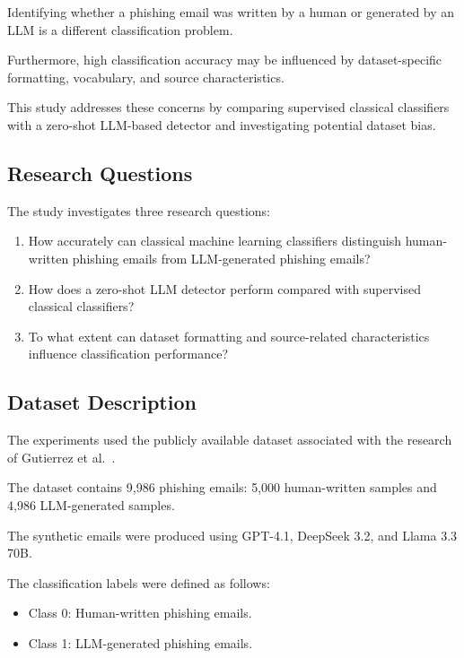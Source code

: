 \documentclass[sigconf,nonacm]{acmart}
\begin{document}
Identifying whether a phishing email was
written by a human or generated by an LLM
is a different classification problem.

Furthermore, high classification accuracy
may be influenced by dataset-specific
formatting, vocabulary, and source
characteristics.

This study addresses these concerns by
comparing supervised classical classifiers
with a zero-shot LLM-based detector and
investigating potential dataset bias.

\subsection{Research Questions}

The study investigates three research
questions:

\begin{enumerate}
    \item How accurately can classical
    machine learning classifiers distinguish
    human-written phishing emails from
    LLM-generated phishing emails?

    \item How does a zero-shot LLM detector
    perform compared with supervised
    classical classifiers?

    \item To what extent can dataset
    formatting and source-related
    characteristics influence classification
    performance?
\end{enumerate}

\subsection{Dataset Description}

The experiments used the publicly available
dataset associated with the research of
Gutierrez et al.~\cite{gutierrez2026}.

The dataset contains 9,986 phishing emails:
5,000 human-written samples and 4,986
LLM-generated samples.

The synthetic emails were produced using
GPT-4.1, DeepSeek 3.2, and
Llama 3.3 70B.

The classification labels were defined as
follows:

\begin{itemize}
    \item Class 0: Human-written phishing emails.
    \item Class 1: LLM-generated phishing emails.
\end{itemize}
\end{document}
